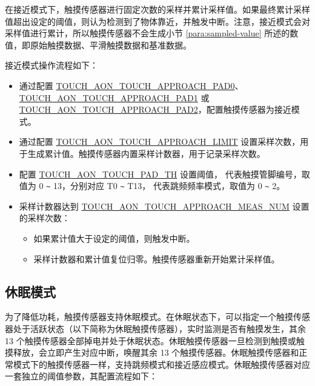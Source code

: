 \documentclass[main\_\_CN.tex]{subfiles}
\begin{document}
在接近模式下，触摸传感器进行固定次数的采样并累计采样值。如果最终累计采样值超出设定的阈值，则认为检测到了物体靠近，并触发中断。注意，接近模式会对采样值进行累计，所以触摸传感器不会生成小节 \ref{para:sampled-value} 所述的数值，即原始触摸数据、平滑触摸数据和基准数据。

接近模式操作流程如下：

\begin{itemize}
    \item 通过配置 \hyperref[fielddesc:TOUCHAONTOUCHAPPROACHPAD0]{TOUCH\_AON\_TOUCH\_APPROACH\_PAD0}、\hyperref[fielddesc:TOUCHAONTOUCHAPPROACHPAD1]{TOUCH\_AON\_TOUCH\_APPROACH\_PAD1} 或 \hyperref[fielddesc:TOUCHAONTOUCHAPPROACHPAD2]{TOUCH\_AON\_TOUCH\_APPROACH\_PAD2}，配置触摸传感器为接近模式。
    \item 通过配置 \hyperref[fielddesc:TOUCHAONTOUCHAPPROACHLIMIT]{TOUCH\_AON\_TOUCH\_APPROACH\_LIMIT} 设置采样次数，用于生成累计值。触摸传感器内置采样计数器，用于记录采样次数。
    \item 配置 \hyperref[fielddesc:TOUCHAONTOUCHPAD0TH0]{TOUCH\_AON\_TOUCH\_PAD\_TH} 设置阈值， 代表触摸管脚编号，取值为 0 \verb+~+ 13，分别对应 T0 \verb+~+ T13， 代表跳频频率模式，取值为 0 \verb+~+ 2。
    \item 采样计数器达到 \hyperref[fielddesc:TOUCHAONTOUCHAPPROACHMEASNUM0]{TOUCH\_AON\_TOUCH\_APPROACH\_MEAS\_NUM} 设置的采样次数：
    \begin{itemize}
        \item 如果累计值大于设定的阈值，则触发中断。
        \item 采样计数器和累计值复位归零。触摸传感器重新开始累计采样值。
    \end{itemize}
\end{itemize}

\subsection{休眠模式}

为了降低功耗，触摸传感器支持休眠模式。在休眠状态下，可以指定一个触摸传感器处于活跃状态（以下简称为休眠触摸传感器），实时监测是否有触摸发生，其余 13 个触摸传感器全部掉电并处于休眠状态。休眠触摸传感器一旦检测到触摸或触摸释放，会立即产生对应中断，唤醒其余 13 个触摸传感器。休眠触摸传感器和正常模式下的触摸传感器一样，支持跳频模式和接近感应模式。休眠触摸传感器对应一套独立的阈值参数，其配置流程如下：
\end{document}
